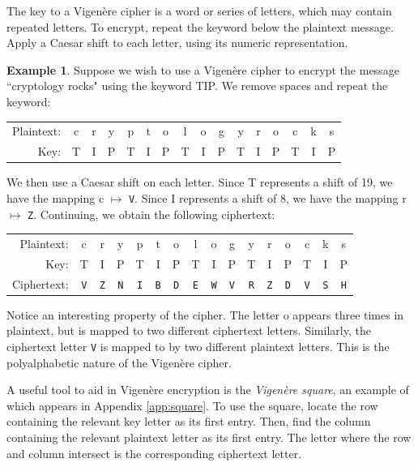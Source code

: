 \documentclass{book}
\theoremstyle{plain}
\theoremstyle{definition}
\newtheorem{example}[theorem]{Example}
\newcommand{\ciphertext}[1]{\texttt{#1}} %
\begin{document}
The key to a Vigen\`{e}re cipher is a word or series of letters, which may contain repeated letters. To encrypt, repeat the keyword below the plaintext message. Apply a Caesar shift to each letter, using its numeric representation.

\begin{example}
Suppose we wish to use a Vigen\`{e}re cipher to encrypt the message ``cryptology rocks" using the keyword TIP. We remove spaces and repeat the keyword:

\begin{center}
\begin{tabular}{rccccccccccccccc}
Plaintext: & c & r & y & p & t & o & l & o & g & y & r & o & c & k & s \\
Key: & T & I & P & T & I & P & T & I & P & T & I & P & T & I & P
\end{tabular}
\end{center}

We then use a Caesar shift on each letter. Since T represents a shift of 19, we have the mapping c $\mapsto$ \ciphertext{V}. Since I represents a shift of 8, we have the mapping r $\mapsto$ \ciphertext{Z}. Continuing, we obtain the following ciphertext:

\begin{center}
\begin{tabular}{rccccccccccccccc}
Plaintext: & c & r & y & p & t & o & l & o & g & y & r & o & c & k & s \\
Key: & T & I & P & T & I & P & T & I & P & T & I & P & T & I & P \\
Ciphertext: & \ciphertext{V} & \ciphertext{Z} & \ciphertext{N} & \ciphertext{I} & \ciphertext{B} & \ciphertext{D} & \ciphertext{E} & \ciphertext{W} & \ciphertext{V} & \ciphertext{R} & \ciphertext{Z} & \ciphertext{D} & \ciphertext{V} & \ciphertext{S} & \ciphertext{H}
\end{tabular}
\end{center}
\end{example}

Notice an interesting property of the cipher. The letter o appears three times in plaintext, but is mapped to two different ciphertext letters. Similarly, the ciphertext letter \ciphertext{V} is mapped to by two different plaintext letters. This is the polyalphabetic nature of the Vigen\`{e}re cipher.

A useful tool to aid in Vigen\`{e}re encryption is the {\it Vigen\`{e}re square}, an example of which appears in Appendix \ref{app:square}. To use the square, locate the row containing the relevant key letter as its first entry. Then, find the column containing the relevant plaintext letter as its first entry. The letter where the row and column intersect is the corresponding ciphertext letter.
\end{document}
